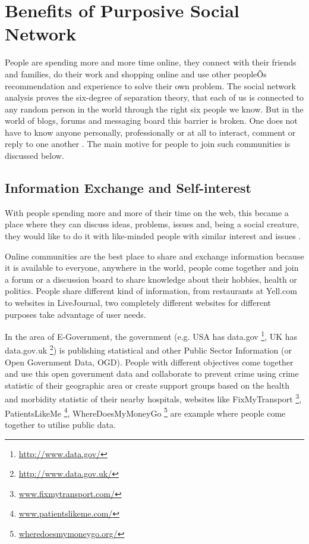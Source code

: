 \section{Benefits of Purposive Social Network}

People are spending more and more time online, they connect with their friends and families, do their work and shopping online and use other peopleÕs recommendation and experience to solve their own problem. The social network analysis proves the six-degree of separation theory, that each of us is connected to any random person in the world through the right six people we know. But in the world of blogs, forums and messaging board this barrier is broken. One does not have to know anyone personally, professionally or at all to interact, comment or reply to one another \cite{monge2003theories}. The main motive for people to join such communities is discussed below.


\subsection{Information Exchange and Self-interest}

With people spending more and more of their time on the web, this became a place where they can discuss ideas, problems, issues and, being a social creature, they would like to do it with like-minded people with similar interest and issues \cite{flake2002self}.

Online communities are the best place to share and exchange information because it is available to everyone, anywhere in the world, people come together and join a forum or a discussion board to share knowledge about their hobbies, health or politics. People share different kind of information, from restaurants at Yell.com to websites in LiveJournal, two completely different websites for different purposes take advantage of user needs.

In the area of E-Government, the government (e.g. USA has data.gov \footnote{\url{http://www.data.gov/}}, UK has data.gov.uk \footnote{\url{http://www.data.gov.uk/}}) is publishing statistical and other Public Sector Information (or Open Government Data, OGD). People with different objectives come together and use this open government data and collaborate to prevent crime using crime statistic of their geographic area or create support groups based on the health and morbidity statistic of their nearby hospitals, websites like FixMyTransport \footnote{\url{www.fixmytransport.com/}}, PatientsLikeMe \footnote{\url{www.patientslikeme.com/}}, WhereDoesMyMoneyGo \footnote{\url{wheredoesmymoneygo.org/}} are example where people come together to utilise public data.


